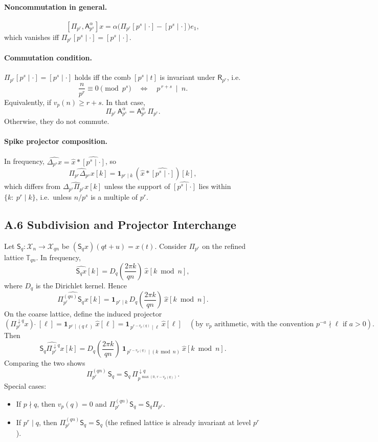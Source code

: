 \documentclass[12pt]{article}
\numberwithin{equation}{section}
\theoremstyle{plain}
\theoremstyle{definition}
\theoremstyle{remark}
\begin{document}
\paragraph{Noncommutation in general.}
\[
[\Pi_{p^r},\mathsf{A}_{p^s}^{\alpha}]x
=\alpha\Big(\Pi_{p^r}[p^s\mid \cdot]-[p^s\mid \cdot]\Big)e_1,
\]
which vanishes iff $\Pi_{p^r}[p^s\mid \cdot]=[p^s\mid \cdot]$.

\paragraph{Commutation condition.}
$\Pi_{p^r}[p^s\mid \cdot]=[p^s\mid \cdot]$ holds iff the comb $[p^s\mid t]$ is invariant under $\mathsf{R}_{p^r}$, i.e.
\[
\frac{n}{p^r}\equiv 0\pmod{p^s}\quad\Longleftrightarrow\quad p^{\,r+s}\ \mid\ n.
\]
Equivalently, if $v_p(n)\ge r+s$. In that case,
\[
\Pi_{p^r}\,\mathsf{A}_{p^s}^{\alpha}=\mathsf{A}_{p^s}^{\alpha}\,\Pi_{p^r}.
\]
Otherwise, they do not commute.

\paragraph{Spike projector composition.}
In frequency, $\widehat{\Delta_{p^s}x}=\widehat{x}\ast \widehat{[p^s\mid \cdot]}$, so
\[
\widehat{\Pi_{p^r}\Delta_{p^s}x}[k]=\mathbf{1}_{p^r\mid k}\,(\widehat{x}\ast \widehat{[p^s\mid \cdot]})[k],
\]
which differs from $\widehat{\Delta_{p^s}\Pi_{p^r}x}[k]$ unless the support of $\widehat{[p^s\mid \cdot]}$ lies within $\{k:\ p^r\mid k\}$, i.e.\ unless $n/p^s$ is a multiple of $p^r$.

\subsection*{A.6 Subdivision and Projector Interchange}
Let $\mathsf{S}_q:\mathcal{X}_n\to\mathcal{X}_{qn}$ be $(\mathsf{S}_q x)(qt+u)=x(t)$. Consider $\Pi_{p^r}$ on the refined lattice $\mathbb{T}_{qn}$.
In frequency,
\[
\widehat{\mathsf{S}_q x}[k]=D_q\!\left(\frac{2\pi k}{qn}\right)\ \widehat{x}[k\bmod n],
\]
where $D_q$ is the Dirichlet kernel. Hence
\[
\widehat{\Pi_{p^r}^{(qn)}\mathsf{S}_q x}[k]
=\mathbf{1}_{\,p^r\mid k}\,D_q\!\left(\frac{2\pi k}{qn}\right)\ \widehat{x}[k\bmod n].
\]
On the coarse lattice, define the induced projector
\[
(\Pi_{p^r}^{\downarrow q}x)\ \widehat{}\ [\ell]=\mathbf{1}_{\,p^r\mid (q\ell)}\ \widehat{x}[\ell]
=\mathbf{1}_{\,p^{r-v_p(q)}\mid \ell}\ \widehat{x}[\ell]\quad(\text{by }v_p\text{ arithmetic, with the convention }p^{-a}\nmid \ell\text{ if }a>0).
\]
Then
\[
\widehat{\mathsf{S}_q \Pi_{p^r}^{\downarrow q}x}[k]
=D_q\!\left(\frac{2\pi k}{qn}\right)\ \mathbf{1}_{\,p^{r-v_p(q)}\mid (k\bmod n)}\ \widehat{x}[k\bmod n].
\]
Comparing the two shows
\[
\Pi_{p^r}^{(qn)}\,\mathsf{S}_q
=\mathsf{S}_q\,\Pi_{p^{\,\max(0,\,r-v_p(q))}}^{\downarrow q}.
\]
Special cases:
\begin{itemize}
\item If $p\nmid q$, then $v_p(q)=0$ and $\Pi_{p^r}^{(qn)}\mathsf{S}_q=\mathsf{S}_q\Pi_{p^r}$.
\item If $p^r\mid q$, then $\Pi_{p^r}^{(qn)}\mathsf{S}_q=\mathsf{S}_q$ (the refined lattice is already invariant at level $p^r$).
\end{itemize}
\end{document}
